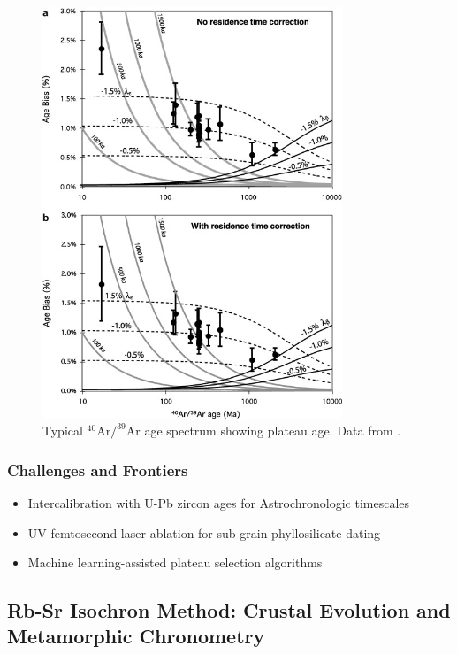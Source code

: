 \documentclass{article}
\begin{document}
\begin{figure}[htbp]
    \centering
    \includegraphics[width=0.8\textwidth]{ar_age_spectrum.jpg}
    \caption{Typical \(^{40}\text{Ar}/^{39}\text{Ar}\) age spectrum showing plateau age. Data from \cite{Renne2010}.}
    \label{fig:ar_spectrum}
\end{figure}

\subsubsection*{Challenges and Frontiers}
\begin{itemize}
\item Intercalibration with U-Pb zircon ages for Astrochronologic timescales 
\item UV femtosecond laser ablation for sub-grain phyllosilicate dating 
\item Machine learning-assisted plateau selection algorithms  
\end{itemize}

\subsection{Rb-Sr Isochron Method: Crustal Evolution and Metamorphic Chronometry}
\label{subsec:rb_sr_method}
\end{document}

